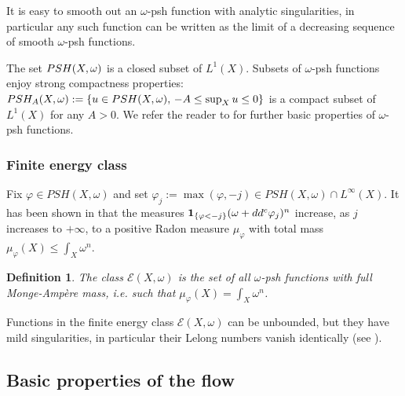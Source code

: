 \documentclass[10pt,a4paper]{amsart}
\numberwithin{equation}{section}
\newtheorem{defi}[theorem]{Definition}
\newcommand{\PSH}{\textup{PSH}}
\newcommand{\f}{\varphi}
\begin{document}
It is easy to smooth out an $\omega$-psh function with analytic singularities, in particular
any such function can be written as the limit of a decreasing sequence of smooth $\omega$-psh functions.

\smallskip


The set $\PSH(X,\omega)$ is a closed subset of $L^1(X)$.
Subsets of  $\omega$-psh functions enjoy strong compactness  properties:
$
\PSH_A(X,\omega):=\{ u \in\PSH(X,\omega), \, -A \leq \sup_X u \leq 0 \} 
$
is a compact subset of $L^1(X)$ for any $A>0$.
We refer the reader to \cite{GZbook} for further basic properties of $\omega$-psh functions.



\subsubsection*{Finite energy class}

Fix $\f \in PSH(X,\omega)$ and set $\f_j:=\max(\f,-j) \in PSH(X,\omega) \cap L^{\infty}(X)$.
It has been shown in \cite{GZ07} that the measures ${\bf 1}_{\{\f<-j\}} (\omega+dd^c \f_j)^n$
increase, as $j$ increases to $+\infty$, to a positive Radon measure 
$\mu_{\f}$ with total mass $\mu_{\f}(X) \leq \int_X \omega^n$.

\begin{defi}
The class $ \mathcal{E}(X,\omega)$ is the set of all $\omega$-psh functions with full Monge-Amp\`ere mass,
i.e. such that $\mu_{\f}(X) =\int_X \omega^n$.
\end{defi}

 
Functions in the finite energy class $\mathcal{E}(X,\omega)$ can be unbounded, but they have mild singularities, in particular
their Lelong numbers vanish identically (see \cite[Theorem 1.1]{DDL2}).
 



\subsection{Basic properties of the flow} \label{sec:construction}
\end{document}
